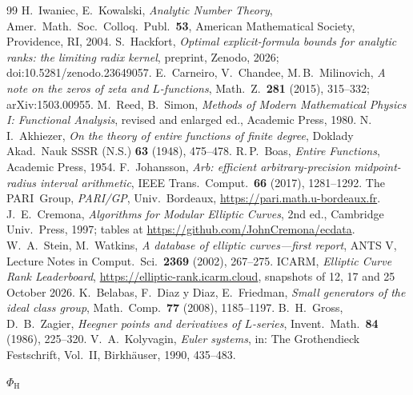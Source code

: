\documentclass[11pt]{amsart}
\theoremstyle{remark}
\theoremstyle{definition}
\begin{document}
\begin{thebibliography}{99}
 H.~Iwaniec, E.~Kowalski, \emph{Analytic Number Theory}, Amer.\ Math.\ Soc.\ Colloq.\ Publ.\ \textbf{53}, American Mathematical Society, Providence, RI, 2004.
 S.~Hackfort, \emph{Optimal explicit-formula bounds for analytic ranks: the limiting radix kernel}, preprint, Zenodo, 2026; doi:10.5281/zenodo.23649057.
 E.~Carneiro, V.~Chandee, M.\,B.~Milinovich, \emph{A note on the zeros of zeta and $L$-functions}, Math.\ Z.\ \textbf{281} (2015), 315--332; arXiv:1503.00955.
 M.~Reed, B.~Simon, \emph{Methods of Modern Mathematical Physics I: Functional Analysis}, revised and enlarged ed., Academic Press, 1980.
 N.\,I.~Akhiezer, \emph{On the theory of entire functions of finite degree}, Doklady Akad.\ Nauk SSSR (N.S.) \textbf{63} (1948), 475--478.
 R.\,P.~Boas, \emph{Entire Functions}, Academic Press, 1954.
 F.~Johansson, \emph{Arb: efficient arbitrary-precision midpoint-radius interval arithmetic}, IEEE Trans.\ Comput.\ \textbf{66} (2017), 1281--1292.
 The PARI~Group, \emph{PARI/GP}, Univ.\ Bordeaux, \url{https://pari.math.u-bordeaux.fr}.
 J.~E.~Cremona, \emph{Algorithms for Modular Elliptic Curves}, 2nd ed., Cambridge Univ.\ Press, 1997; tables at \url{https://github.com/JohnCremona/ecdata}.
 W.~A.~Stein, M.~Watkins, \emph{A database of elliptic curves---first report}, ANTS V, Lecture Notes in Comput.\ Sci.\ \textbf{2369} (2002), 267--275.
 ICARM, \emph{Elliptic Curve Rank Leaderboard}, \url{https://elliptic-rank.icarm.cloud}, snapshots of 12, 17 and 25 October 2026.
 K.~Belabas, F.~Diaz y Diaz, E.~Friedman, \emph{Small generators of the ideal class group}, Math.\ Comp.\ \textbf{77} (2008), 1185--1197.
 B.~H.~Gross, D.~B.~Zagier, \emph{Heegner points and derivatives of $L$-series}, Invent.\ Math.\ \textbf{84} (1986), 225--320.
 V.~A.~Kolyvagin, \emph{Euler systems}, in: The Grothendieck Festschrift, Vol.~II, Birkh\"auser, 1990, 435--483.
\end{thebibliography}

\vfill
\noindent\hfill{\footnotesize$\Phi_{\mathrm H}$}
\end{document}
